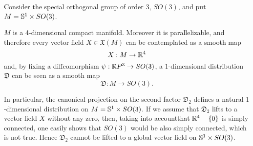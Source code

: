 \vspace{2mm}


Consider the special orthogonal group of order 3, $SO(3)$, and put $M=\S^{1}\times SO(3)$.

$M$ is a 4-dimensional compact manifold. Moreover it is parallelizable, and therefore every vector field $X\in\mathfrak{X}(M)$ can be contemplated as a smooth map $$X:M\rightarrow \R^{4}$$ and, by fixing a diffeomorphism $\psi:\R P^{3}\rightarrow SO(3)$, a $1$-dimensional distribution $\mathfrak{D}$ can be seen as a smooth map $$\mathfrak{D}:M\rightarrow SO(3).$$

In particular, the canonical projection on the second factor $\mathfrak{D}_2$ defines a natural $1$-dimensional distribution on $M=\S^{1}\times SO(3)$. If we assume that $\mathfrak{D}_2$ lifts to a vector field $X$ without any zero, then, taking into accountthat $\R^{4}-\{0\}$ is simply connected, one easily shows that $SO(3)$ would be also simply connected, which is not true. Hence $\mathfrak{D}_2$ cannot be lifted to a global vector field on $\S^{1}\times SO(3)$.
